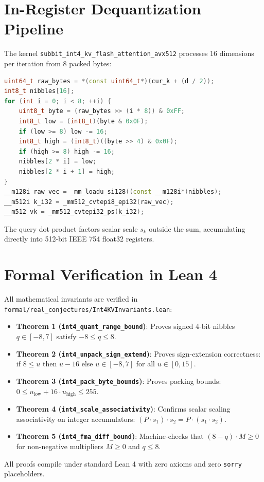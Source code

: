 \documentclass[11pt,a4paper]{article}
\begin{document}
\section{In-Register Dequantization Pipeline}
The kernel \texttt{subbit\_int4\_kv\_flash\_attention\_avx512} processes 16 dimensions per iteration from 8 packed bytes:
\begin{lstlisting}[language=C++]
uint64_t raw_bytes = *(const uint64_t*)(cur_k + (d / 2));
int8_t nibbles[16];
for (int i = 0; i < 8; ++i) {
    uint8_t byte = (raw_bytes >> (i * 8)) & 0xFF;
    int8_t low = (int8_t)(byte & 0x0F);
    if (low >= 8) low -= 16;
    int8_t high = (int8_t)((byte >> 4) & 0x0F);
    if (high >= 8) high -= 16;
    nibbles[2 * i] = low;
    nibbles[2 * i + 1] = high;
}
__m128i raw_vec = _mm_loadu_si128((const __m128i*)nibbles);
__m512i k_i32 = _mm512_cvtepi8_epi32(raw_vec);
__m512 vk = _mm512_cvtepi32_ps(k_i32);
\end{lstlisting}
The query dot product factors scalar scale $s_k$ outside the sum, accumulating directly into 512-bit IEEE 754 float32 registers.

\section{Formal Verification in Lean 4}
All mathematical invariants are verified in \texttt{formal/real\_conjectures/Int4KVInvariants.lean}:
\begin{itemize}
    \item \textbf{Theorem 1 (\texttt{int4\_quant\_range\_bound})}: Proves signed 4-bit nibbles $q \in [-8, 7]$ satisfy $-8 \le q \le 8$.
    \item \textbf{Theorem 2 (\texttt{int4\_unpack\_sign\_extend})}: Proves sign-extension correctness: if $8 \le u$ then $u - 16$ else $u \in [-8, 7]$ for all $u \in [0, 15]$.
    \item \textbf{Theorem 3 (\texttt{int4\_pack\_byte\_bounds})}: Proves packing bounds: $0 \le u_{\text{low}} + 16 \cdot u_{\text{high}} \le 255$.
    \item \textbf{Theorem 4 (\texttt{int4\_scale\_associativity})}: Confirms scalar scaling associativity on integer accumulators: $(P \cdot s_1) \cdot s_2 = P \cdot (s_1 \cdot s_2)$.
    \item \textbf{Theorem 5 (\texttt{int4\_fma\_diff\_bound})}: Machine-checks that $(8 - q) \cdot M \ge 0$ for non-negative multipliers $M \ge 0$ and $q \le 8$.
\end{itemize}
All proofs compile under standard Lean 4 with zero axioms and zero \texttt{sorry} placeholders.
\end{document}
